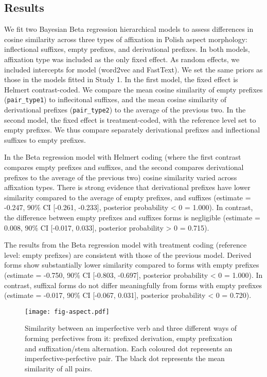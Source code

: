 \documentclass[12pt]{article}
\begin{document}
\subsection{Results} \label{results2}

We fit two Bayesian Beta regression hierarchical models to assess differences in cosine similarity across three types of affixation in Polish aspect morphology: inflectional suffixes, empty prefixes, and derivational prefixes. In both models, affixation type was included as the only fixed effect. As random effects, we included intercepts for model (word2vec and FastText). We set the same priors as those in the models fitted in Study 1. In the first model, the fixed effect is Helmert contrast-coded. We compare the mean cosine similarity of empty prefixes (\texttt{pair\_type1}) to inflecitonal suffixes, and the mean cosine similarity of derivational prefixes (\texttt{pair\_type2}) to the average of the previous two. In the second model, the fixed effect is treatment-coded, with the reference level set to empty prefixes. We thus compare separately derivational prefixes and inflectional suffixes to empty prefixes.

In the Beta regression model with Helmert coding (where the first contrast compares empty prefixes and suffixes, and the second compares derivational prefixes to the average of the previous two) cosine similarity varied across affixation types. There is strong evidence that derivational prefixes have lower similarity compared to the average of empty prefixes, and suffixes (estimate = -0.247, 90\% CI [-0.261, -0.233], posterior probability < 0 = 1.000). In contrast, the difference between empty prefixes and suffixes forms is negligible (estimate = 0.008, 90\% CI [-0.017, 0.033], posterior probability > 0 = 0.715).

The results from the Beta regression model with treatment coding (reference level: empty prefixes) are consistent with those of the previous model. Derived forms show substantially lower similarity compared to forms with empty prefixes (estimate = -0.750, 90\% CI [-0.803, -0.697], posterior probability < 0 = 1.000). In contrast, suffixal forms do not differ meaningfully from forms with empty prefixes (estimate = -0.017, 90\% CI [-0.067, 0.031], posterior probability < 0 = 0.720).

\begin{figure}[htbp]
\centering
\texttt{[image: fig-aspect.pdf]}
\caption{Similarity between an imperfective verb and three different ways of forming perfectives from it: prefixed derivation, empty prefixation and suffixation/stem alternation. Each coloured dot represents an imperfective-perfective pair. The black dot represents the mean similarity of all pairs.}
\label{fig:aspect}
\end{figure}
\end{document}
